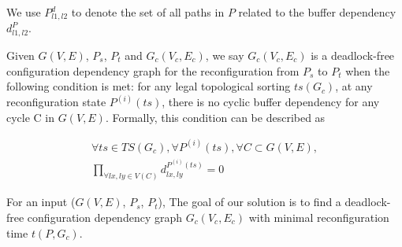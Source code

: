 We use $P^d_{l1,l2}$ to denote the set of all paths in $P$ related to the buffer dependency $d_{l1,l2}^P$.

Given $G(V,E)$, $P_s$, $P_t$ and $G_c(V_c,E_c)$,  we say $G_c(V_c,E_c)$ is a deadlock-free configuration dependency graph for the  reconfiguration from $P_s$ to $P_t$ when the following condition is met: for any legal topological sorting $ts(G_c)$, at any reconfiguration state ${P^{(i)}(ts)}$, there is no cyclic buffer dependency for any cycle C in $G(V,E)$.  Formally, this condition can be described as

\begin{equation}  \label{eq:2}
\begin{split}
 \forall ts \in TS(G_c), \forall P^{(i)}(ts), \forall C \subset G(V,E), \\
 \displaystyle{\prod\limits_{\forall lx, ly \in V(C)} d_{lx,ly}^{P^{(i)}(ts)} =0}
 \end{split}
\end{equation} 

For an input ($G(V,E)$, $P_s$, $P_t$), The goal of our solution is to find a deadlock-free configuration dependency graph $G_c(V_c,E_c)$ with minimal reconfiguration time $t(P, G_c)$.
%  

% 
%  


%
%

